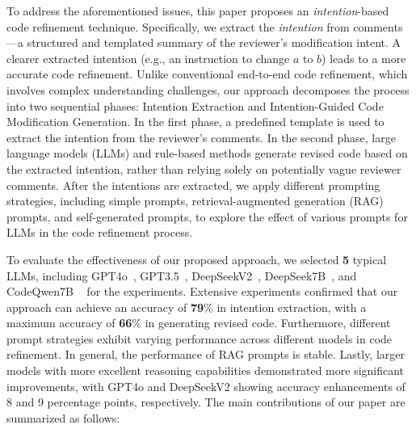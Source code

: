 To address the aforementioned issues, this paper proposes an \textit{intention}-based code refinement technique. Specifically, we extract the \textit{intention} from comments—a structured and templated summary of the reviewer’s modification intent. A clearer extracted intention (e.g., an instruction to change $a$ to $b$) leads to a more accurate code refinement. Unlike conventional end-to-end code refinement, which involves complex understanding challenges, our approach decomposes the process into two sequential phases: Intention Extraction and Intention-Guided Code Modification Generation. In the first phase, a predefined template is used to extract the intention from the reviewer’s comments. In the second phase, large language models (LLMs) and rule-based methods generate revised code based on the extracted intention, rather than relying solely on potentially vague reviewer comments. 
After the intentions are extracted, we apply different prompting strategies, including simple prompts, retrieval-augmented generation (RAG) prompts, and self-generated prompts, to explore the effect of various prompts for LLMs in the code refinement process.

To evaluate the effectiveness of our proposed approach, we selected \textbf{5} typical LLMs, including GPT4o~\cite{achiam2023gpt}, GPT3.5~\cite{ouyang2022training}, DeepSeekV2~\cite{zhu2024deepseek}, DeepSeek7B~\cite{guo2024deepseek}, and CodeQwen7B ~\cite{bai2023qwen} for the experiments. Extensive experiments confirmed that our approach can achieve an accuracy of \textbf{79}\% in intention extraction, with a maximum accuracy of \textbf{66}\% in generating revised code. Furthermore, different prompt strategies exhibit varying performance across different models in code refinement. In general, the performance of RAG prompts is stable. Lastly, larger models with more excellent reasoning capabilities demonstrated more significant improvements, with GPT4o and DeepSeekV2 showing accuracy enhancements of 8 and 9 percentage points, respectively. The main contributions of our paper are summarized as follows:

